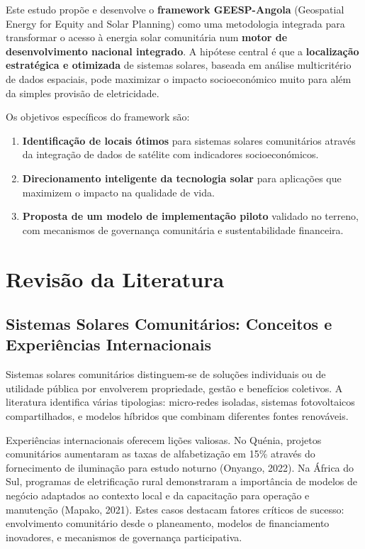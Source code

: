 \documentclass[12pt, a4paper]{article}
\begin{document}
Este estudo propõe e desenvolve o \textbf{framework GEESP-Angola} (Geospatial Energy for Equity and Solar Planning) como uma metodologia integrada para transformar o acesso à energia solar comunitária num \textbf{motor de desenvolvimento nacional integrado}. A hipótese central é que a \textbf{localização estratégica e otimizada} de sistemas solares, baseada em análise multicritério de dados espaciais, pode maximizar o impacto socioeconómico muito para além da simples provisão de eletricidade.

Os objetivos específicos do framework são:
\begin{enumerate}
    \item \textbf{Identificação de locais ótimos} para sistemas solares comunitários através da integração de dados de satélite com indicadores socioeconómicos.
    \item \textbf{Direcionamento inteligente da tecnologia solar} para aplicações que maximizem o impacto na qualidade de vida.
    \item \textbf{Proposta de um modelo de implementação piloto} validado no terreno, com mecanismos de governança comunitária e sustentabilidade financeira.
\end{enumerate}

\section{Revisão da Literatura}

\subsection{Sistemas Solares Comunitários: Conceitos e Experiências Internacionais}

Sistemas solares comunitários distinguem-se de soluções individuais ou de utilidade pública por envolverem propriedade, gestão e benefícios coletivos. A literatura identifica várias tipologias: micro-redes isoladas, sistemas fotovoltaicos compartilhados, e modelos híbridos que combinam diferentes fontes renováveis.

Experiências internacionais oferecem lições valiosas. No Quénia, projetos comunitários aumentaram as taxas de alfabetização em 15\% através do fornecimento de iluminação para estudo noturno (Onyango, 2022). Na África do Sul, programas de eletrificação rural demonstraram a importância de modelos de negócio adaptados ao contexto local e da capacitação para operação e manutenção (Mapako, 2021). Estes casos destacam fatores críticos de sucesso: envolvimento comunitário desde o planeamento, modelos de financiamento inovadores, e mecanismos de governança participativa.
\end{document}
